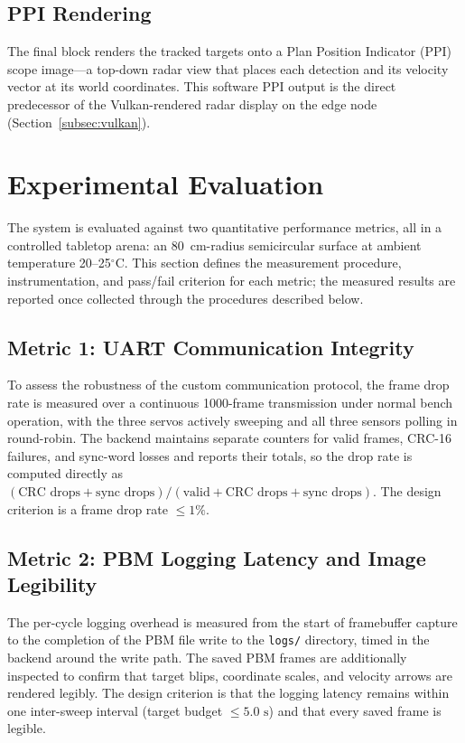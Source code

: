 \documentclass[conference]{IEEEtran}
\begin{document}
\subsection{PPI Rendering}
The final block renders the tracked targets onto a Plan Position Indicator (PPI) scope image---a top-down radar view that places each detection and its velocity vector at its world coordinates. This software PPI output is the direct predecessor of the Vulkan-rendered radar display on the edge node (Section~\ref{subsec:vulkan}).

\section{Experimental Evaluation}
\label{sec:evaluation}
The system is evaluated against two quantitative performance metrics, all in a controlled tabletop arena: an 80~cm-radius semicircular surface at ambient temperature 20--25$^\circ$C. This section defines the measurement procedure, instrumentation, and pass/fail criterion for each metric; the measured results are reported once collected through the procedures described below.

\subsection{Metric 1: UART Communication Integrity}
To assess the robustness of the custom communication protocol, the frame drop rate is measured over a continuous 1000-frame transmission under normal bench operation, with the three servos actively sweeping and all three sensors polling in round-robin. The backend maintains separate counters for valid frames, CRC-16 failures, and sync-word losses and reports their totals, so the drop rate is computed directly as $(\text{CRC drops} + \text{sync drops}) / (\text{valid} + \text{CRC drops} + \text{sync drops})$. The design criterion is a frame drop rate $\le 1\%$.

\subsection{Metric 2: PBM Logging Latency and Image Legibility}
The per-cycle logging overhead is measured from the start of framebuffer capture to the completion of the PBM file write to the \texttt{logs/} directory, timed in the backend around the write path. The saved PBM frames are additionally inspected to confirm that target blips, coordinate scales, and velocity arrows are rendered legibly. The design criterion is that the logging latency remains within one inter-sweep interval (target budget $\le 5.0\text{ s}$) and that every saved frame is legible.
\end{document}
